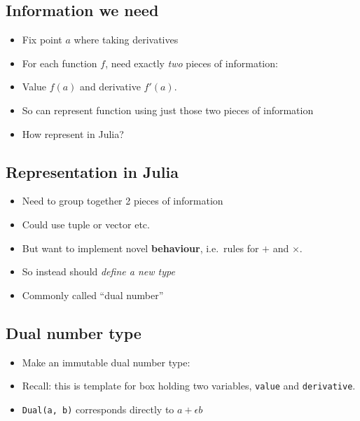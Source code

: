 \hypertarget{information-we-need}{%
\subsection{Information we need}\label{information-we-need}}

\begin{itemize}
\item
  Fix point \(a\) where taking derivatives
\item
  For each function \(f\), need exactly \emph{two} pieces of
  information:
\item
  Value \(f(a)\) and derivative \(f'(a)\).
\item
  So can represent function using just those two pieces of information
\item
  How represent in Julia?
\end{itemize}

\hypertarget{representation-in-julia}{%
\subsection{Representation in Julia}\label{representation-in-julia}}

\begin{itemize}
\item
  Need to group together 2 pieces of information
\item
  Could use tuple or vector etc.
\item
  But want to implement novel \textbf{behaviour}, i.e.~rules for \(+\)
  and \(\times\).
\item
  So instead should \emph{define a new type}
\item
  Commonly called ``dual number''
\end{itemize}

\hypertarget{dual-number-type}{%
\subsection{Dual number type}\label{dual-number-type}}

\begin{itemize}
\item
  Make an immutable dual number type:

\begin{Shaded}
\begin{Highlighting}[]
\end{Highlighting}
\end{Shaded}
\item
  Recall: this is template for box holding two variables, \texttt{value}
  and \texttt{derivative}.
\item
  \texttt{Dual(a,\ b)} corresponds directly to \(a + \epsilon b\)
\end{itemize}

